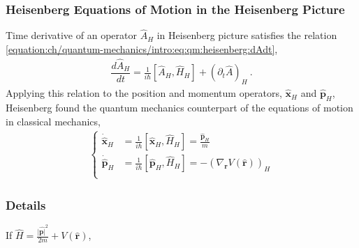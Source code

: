 \documentclass[letterpaper,10pt,english]{jupyterBook}
\begin{document}
\subsubsection{Heisenberg Equations of Motion in the Heisenberg Picture}
\label{\detokenize{ch/quantum-mechanics/history/heisenberg-reinterpretation:heisenberg-equations-of-motion-in-the-heisenberg-picture}}\label{\detokenize{ch/quantum-mechanics/history/heisenberg-reinterpretation:quantum-mechanics-history-heisenberg-reinterpretation-eoms}}
\sphinxAtStartPar
Time derivative of an operator \(\hat{A}_H\) in Heisenberg picture satisfies the relation \eqref{equation:ch/quantum-mechanics/intro:eq:qm:heisenberg:dAdt},
\begin{equation*}
\begin{split}\dfrac{d \hat{A}_H}{dt} = \frac{1}{i \hbar} \left[ \hat{A}_H , \hat{H}_H \right] + \left( \partial_t \hat{A} \right)_H \ .\end{split}
\end{equation*}
\sphinxAtStartPar
Applying this relation to the position and momentum operators, \(\hat{\mathbf{x}}_H\) and \(\hat{\mathbf{p}}_H\), Heisenberg found the quantum mechanics counterpart of the equations of motion in classical mechanics,
\begin{equation}\label{equation:ch/quantum-mechanics/history/heisenberg-reinterpretation:eq:qm:heisenberg:eoms-1}
\begin{split}\left\{
\begin{aligned}
  \dot{\hat{\mathbf{x}}}_H & = \frac{1}{i \hbar} \left[ \hat{\mathbf{x}}_H , \hat{H}_H \right] = \frac{\hat{\mathbf{p}}_H}{m} \\
  \dot{\hat{\mathbf{p}}}_H & = \frac{1}{i \hbar} \left[ \hat{\mathbf{p}}_H , \hat{H}_H \right] = - \left( \nabla_{\mathbf{r}} V\left( \hat{\mathbf{r}}\right) \right)_H \\
\end{aligned}
\right.\end{split}
\end{equation}\subsubsection*{Details}

\sphinxAtStartPar
If \(\hat{H} = \frac{|\hat{\mathbf{p}|}^2}{2 m} + V\left(\hat{\mathbf{r}}\right)\),
\end{document}
